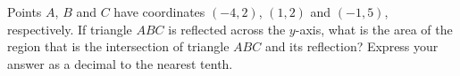 Points $A$, $B$ and $C$ have coordinates $(-4,2)$, $(1,2)$ and $(-1,5)$, respectively. If triangle $ABC$ is reflected across the $y$-axis, what is the area of the region that is the intersection of triangle $ABC$ and its reflection? Express your answer as a decimal to the nearest tenth.
